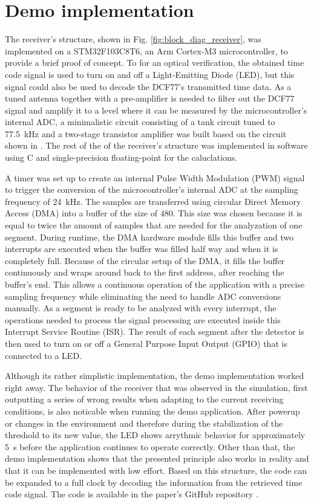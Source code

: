 \documentclass[conference]{IEEEtran}
\begin{document}
\section{Demo implementation}
The receiver's structure, shown in Fig. \ref{fig:block_diag_receiver}, was implemented on a STM32F103C8T6, an Arm Cortex-M3 microcontroller, to provide a brief proof of concept.
To for an optical verification, the obtained time code signal is used to turn on and off a Light-Emitting Diode (LED), but this signal
could also be used to decode the DCF77's transmitted time data.
As a tuned antenna together with a pre-amplifier is needed to filter out the DCF77 signal and amplify it to a level where it can be measured by the microcontroller's internal ADC, a minimalistic circuit 
consisting of a tank circuit tuned to \SI{77.5}{\kilo\hertz} and a two-stage transistor amplifier was built based on the circuit shown in \cite{b12}.
The rest of the of the receiver's structure was implemented in software using C and single-precision floating-point for the caluclations.
\par
A timer was set up to create an internal Pulse Width Modulation (PWM) signal to trigger the conversion of the microcontroller's internal ADC at the sampling frequency of \SI{24}{\kilo\hertz}.
The samples are transferred using circular Direct Memory Access (DMA) into a buffer of the size of $480$.
This size was chosen because it is equal to twice the amount of samples that are needed for the analyzation of one segment.
During runtime, the DMA hardware module fills this buffer and two interrupts are executed when the buffer was filled half way and when it is completely full.
Because of the circular setup of the DMA, it fills the buffer continuously and wraps around back to the first address, after reaching the buffer's end.
This allows a continuous operation of the application with a precise sampling frequency while eliminating the need to handle ADC conversions manually. 
As a segment is ready to be analyzed with every interrupt, the operations needed to process the signal processing are executed inside this Interrupt Service Routine (ISR).
The result of each segment after the detector is then used to turn on or off a General Purpose Input Output (GPIO) that is connected to a LED.
\par
Although its rather simplistic implementation, the demo implementation worked right away.
The behavior of the receiver that was observed in the simulation, first outputting a series of wrong results when adapting to the
current receiving conditions, is also noticable when running the demo application.
After powerup or changes in the environment and therefore during the stabilization of the threshold to its new value, the LED shows
arrythmic behavior for approximately \SI{5}{\second} before the application continues to operate correctly.
Other than that, the demo implementation shows that the presented principle also works in reality and that it can be implemented
with low effort.
Based on this structure, the code can be expanded to a full clock by decoding the information from the retrieved time code signal.
The code is available in the paper's GitHub repository \cite{b13}.
\end{document}
